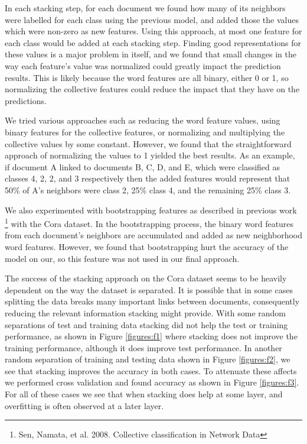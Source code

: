 \documentclass[a4paper,11pt]{article}
\begin{document}
In each stacking step, for each document we found how many of its
neighbors were labelled for each class using the previous model, and added 
those the values which were non-zero as new features. Using this approach,
at most one feature for each class would be added at each stacking step.
Finding good representations for these values is a major problem in itself,
and we found that small changes in the way each feature's value was normalized
could greatly impact the prediction results. This is likely because the word
features are all binary, either 0 or 1, so normalizing the collective features
could reduce the impact that they have on the predictions.

We tried various approaches such as reducing the word feature 
values, using binary features for the collective features, or normalizing 
and multiplying the collective values by some constant. However, we found
that the straightforward approach of normalizing the values to 1 yielded 
the best results. As an example, if document A linked to documents 
B, C, D, and E, which were classified as classes 4, 2, 2, and 3
respectively then the added features would represent that 50\% of A's neighbors 
were class 2, 25\% class 4, and the remaining 25\% class 3. 

We also experimented with bootstrapping features as described in previous work
\footnote{Sen, Namata, et al. 2008. Collective classification in Network Data}
with the Cora dataset. In the bootstrapping process, the binary word features from
each document's neighbors are accumulated and added as new neighborhood word features.
However, we found that bootstrapping hurt the accuracy of the model on our, so this
feature was not used in our final approach.

The success of the stacking approach on the Cora dataset seems to be heavily
dependent on the way the dataset is separated. It is possible that in some 
cases splitting the data breaks many important links between documents,
consequently reducing the relevant information stacking might provide. 
With some random separations of test and training data stacking did not help
the test or training performance, as shown in Figure \ref{figures:f1} where
stacking does not improve the training performance, although it does improve
test performance. In another random separation of training and testing data 
shown in Figure \ref{figures:f2}, we see that stacking improves the accuracy 
in both cases. To attenuate these affects we performed cross validation and 
found accuracy as shown in Figure \ref{figures:f3}. For all of these cases we 
see that when stacking does help at some layer, and overfitting is often observed at a later layer.
\end{document}
